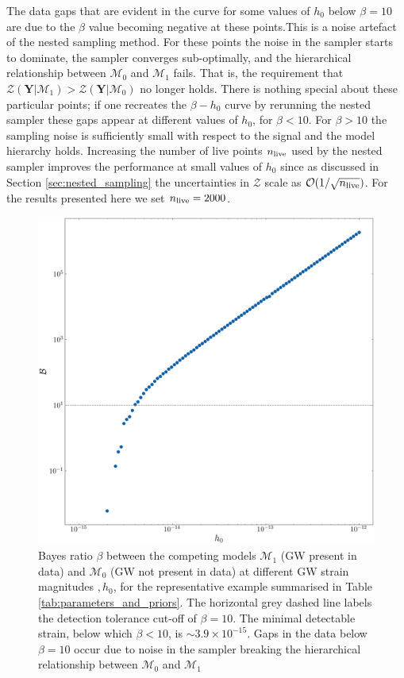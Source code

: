\documentclass[fleqn,usenatbib,useAMS]{mnras}
\begin{document}
The data gaps that are evident in the curve for some values of $h_0$ below $\beta =10$ are due to the $\beta$ value becoming negative at these points.This is a noise artefact of the nested sampling method. For these points the noise in the sampler starts to dominate, the sampler converges sub-optimally, and the hierarchical relationship between $\mathcal{M}_0$ and  $\mathcal{M}_1$ fails. That is, the requirement that $\mathcal{Z}(\boldsymbol{Y} | \mathcal{M}_1) > \mathcal{Z}(\boldsymbol{Y} | \mathcal{M}_0)$ no longer holds. There is nothing special about these particular points; if one recreates the $\beta - h_0$ curve by rerunning the nested sampler these gaps appear at different values of $h_0$, for $\beta < 10$. For $\beta > 10$ the sampling noise is sufficiently small with respect to the signal and the model hierarchy holds. Increasing the number of live points $n_{\rm live}$ used by the nested sampler improves the performance at small values of $h_0$ since as discussed in Section \ref{sec:nested_sampling} the uncertainties in $\mathcal{Z}$ scale as $\mathcal{O}(1/ \sqrt{n_{\rm live}})$. For the results presented here we set $n_{\rm live} =2000$. 
\begin{figure}
	\includegraphics[width=\columnwidth]{images/CanonicalBayesPlot2000}
	\caption{Bayes ratio $\beta$ between the competing models $\mathcal{M}_1$ (GW present in data) and $\mathcal{M}_0$ (GW not present in data) at different GW strain magnitudes $,h_0$, for the representative example summarised in Table \ref{tab:parameters_and_priors}. The horizontal grey dashed line labels the detection tolerance cut-off of $\beta = 10$. The minimal detectable strain, below which $\beta < 10$, is $\sim 3.9 \times 10^{-15}$. Gaps in the data below $\beta=10$ occur due to noise in the sampler breaking the hierarchical relationship between $\mathcal{M}_0$ and $\mathcal{M}_1$}
	\label{fig:bayes}
\end{figure}
\end{document}
